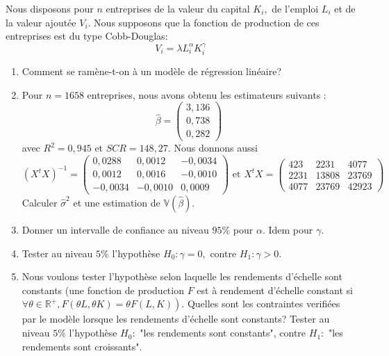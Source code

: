 \documentclass{td_um}
\providecommand{\1}{\mathds{1}}
\begin{document}
 Nous disposons pour $n$ entreprises de la valeur du capital $K_{i},$ de l'emploi $L_{i}$ et de la valeur ajoutée $V_{i}$. Nous supposons que la fonction de production de ces entreprises est du type Cobb-Douglas:
\[
V_{i}=\lambda L_{i}^{\alpha} K_{i}^{\gamma}
\]
\begin{enumerate}
\item Comment se ramène-t-on à un modèle de régression linéaire?
\item Pour $n=1658$ entreprises, nous avons obtenu les estimateurs suivants :
\[
    \hat{\beta}=\begin{pmatrix}3,136 \\ 0,738 \\ 0,282\end{pmatrix}
\]
avec $R^{2}=0,945$ et $S C R=148,27$. Nous donnons aussi
\[
    \left(X^{t} X\right)^{-1}=\left(\begin{array}{ccc}
            0,0288 & 0,0012 & -0,0034 \\
            0,0012 & 0,0016 & -0,0010 \\
            -0,0034 & -0,0010 & 0,0009
    \end{array}\right) \text { et } X^{t} X=\left(\begin{array}{ccc}
            423 & 2231 & 4077 \\
            2231 & 13808 & 23769 \\
            4077 & 23769 & 42923
    \end{array}\right)
\]
Calculer $\hat{\sigma}^{2}$ et une estimation de $\mathbb{V}(\hat{\beta})$.
\item Donner un intervalle de confiance au niveau $95 \%$ pour $\alpha$. Idem pour $\gamma$.
\item Tester au niveau $5 \%$ l'hypothèse $H_{0}: \gamma=0,$ contre $H_{1}: \gamma>0$.
\item Nous voulons tester l'hypothèse selon laquelle les rendements d'échelle sont constants (une fonction de production $F$ est à rendement d'échelle constant si $\left.\forall \theta \in \mathbb{R}^{+}, F(\theta L, \theta K)=\theta F(L, K)\right)$. Quelles sont les contraintes verifiées par le modèle lorsque les rendements d'échelle sont constants? Tester au niveau $5 \%$ l'hypothèse  $H_{0}:$ "les rendements sont constants", contre $H_{1}:$ "les rendements sont croissants".
    \end{enumerate}
\end{document}
